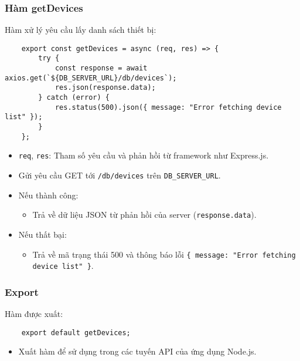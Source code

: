             \subsubsection{Hàm getDevices}
                \hspace*{0.6cm}Hàm xử lý yêu cầu lấy danh sách thiết bị:
                \begin{lstlisting}
    export const getDevices = async (req, res) => {
        try {
            const response = await axios.get(`${DB_SERVER_URL}/db/devices`);
            res.json(response.data);
        } catch (error) {
            res.status(500).json({ message: "Error fetching device list" });
        }
    };
                \end{lstlisting}
                \begin{itemize}
                    \item \texttt{req}, \texttt{res}: Tham số yêu cầu và phản hồi từ framework như Express.js.
                    \item Gửi yêu cầu GET tới \texttt{/db/devices} trên \texttt{DB\_SERVER\_URL}.
                    \item Nếu thành công:
                    \begin{itemize}
                        \item Trả về dữ liệu JSON từ phản hồi của server (\texttt{response.data}).
                    \end{itemize}
                    \item Nếu thất bại:
                    \begin{itemize}
                        \item Trả về mã trạng thái 500 và thông báo lỗi \texttt{\{ message: "Error fetching device list" \}}.
                    \end{itemize}
                \end{itemize}

            \subsubsection{Export}
                \hspace*{0.6cm}Hàm được xuất:
                \begin{lstlisting}
    export default getDevices;
                \end{lstlisting}
                \begin{itemize}
                    \item Xuất hàm để sử dụng trong các tuyến API của ứng dụng Node.js.
                \end{itemize}

